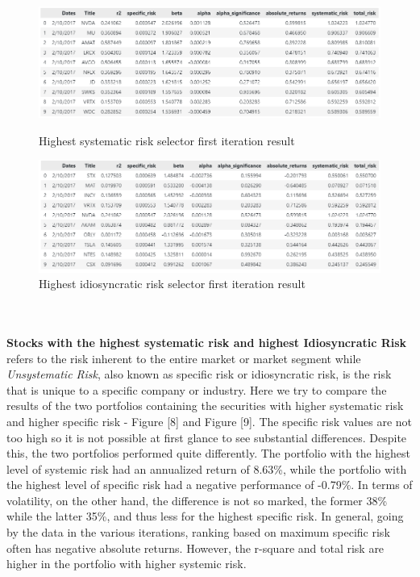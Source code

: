 \documentclass[twocolumn]{article}
\begin{document}
\begin{figure}[t]
\centering\includegraphics[scale=0.45]{highestSystematicRisk.png}
\caption{Highest systematic risk selector first iteration result}
\centering\includegraphics[scale=0.45]{highSpecificRIsk.png}
\caption{Highest idiosyncratic risk selector first iteration result}
\end{figure}
\\\\
\textbf{Stocks with the highest systematic risk and highest Idiosyncratic Risk}\\
 refers to the risk inherent to the entire market or market segment while \textit{Unsystematic Risk}, also known as specific risk or idiosyncratic risk, is the risk that is unique to a specific company or industry. Here we try to compare the results of the two portfolios containing the securities with higher systematic risk and higher specific risk - Figure [8] and Figure [9]. The specific risk values are not too high so it is not possible at first glance to see substantial differences. Despite this, the two portfolios performed quite differently. The portfolio with the highest level of systemic risk had an annualized return of 8.63\%, while the portfolio with the highest level of specific risk had a negative performance of -0.79\%. In terms of volatility, on the other hand, the difference is not so marked, the former 38\% while the latter 35\%, and thus less for the highest specific risk. In general, going by the data in the various iterations, ranking based on maximum specific risk often has negative absolute returns. However, the r-square and total risk are higher in the portfolio with higher systemic risk.
\end{document}
